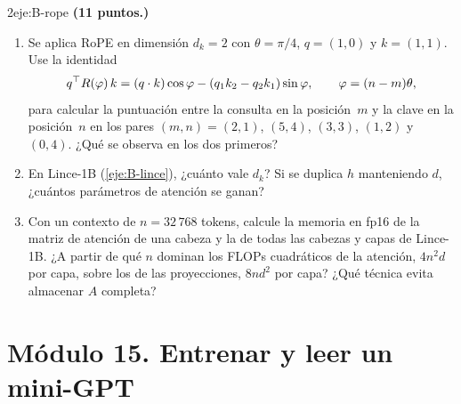 \begin{ejercicio}{2}{eje:B-rope}
\textbf{(11 puntos.)}
\begin{enumerate}[label=(\alph*)]
  \item {} Se aplica RoPE en dimensión $d_k=2$ con $\theta=\pi/4$, $q=(1,0)$ y $k=(1,1)$. Use la identidad
  \[
  q^{\top} R(\varphi)\,k=(q\cdot k)\cos\varphi-(q_1k_2-q_2k_1)\sin\varphi,\qquad \varphi=(n-m)\theta,
  \]
  para calcular la puntuación entre la consulta en la posición~$m$ y la clave en la posición~$n$ en los pares $(m,n)=(2,1)$, $(5,4)$, $(3,3)$, $(1,2)$ y $(0,4)$. ¿Qué se observa en los dos primeros?
  \item {} En Lince-1B (\cref{eje:B-lince}), ¿cuánto vale $d_k$? Si se duplica $h$ manteniendo $d$, ¿cuántos parámetros de atención se ganan?
  \item {} Con un contexto de $n=32\,768$ tokens, calcule la memoria en fp16 de la matriz de atención de una cabeza y la de todas las cabezas y capas de Lince-1B. ¿A partir de qué $n$ dominan los FLOPs cuadráticos de la atención, $4n^{2}d$ por capa, sobre los de las proyecciones, $8nd^{2}$ por capa? ¿Qué técnica evita almacenar $A$ completa?
\end{enumerate}
\end{ejercicio}

\section*{Módulo 15. Entrenar y leer un mini-GPT}

